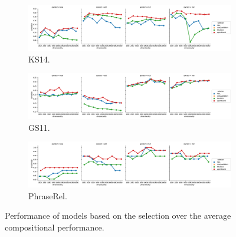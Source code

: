 \begin{figure}
  \centering

  \begin{subfigure}[t]{\textwidth}
    \includegraphics[width=\textwidth]{supplement/figures/compositional-results-ks14}
    \caption{KS14.}
    \label{fig:compositional-results-ks14}
  \end{subfigure}

  \begin{subfigure}[t]{\textwidth}
    \includegraphics[width=\textwidth]{supplement/figures/compositional-results-gs11}
    \caption{GS11.}
    \label{fig:compositional-results-gs11}
  \end{subfigure}

  \begin{subfigure}[t]{\textwidth}
    \includegraphics[width=\textwidth]{supplement/figures/compositional-results-phraserel}
    \caption{PhraseRel.}
    \label{fig:compositional-results-phraserel}
  \end{subfigure}


  \caption{Performance of models based on the selection over the average compositional performance.}
  \label{fig:compositional-results}
\end{figure}

